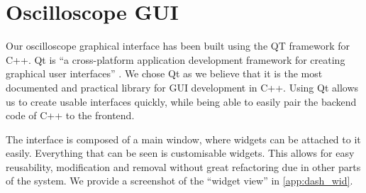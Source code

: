 \section{Oscilloscope GUI}
    Our oscilloscope graphical interface has been built using the QT framework for C++. Qt is ``a cross-platform application development framework for creating graphical user interfaces'' \cite{qt-w}. We chose Qt as we believe that it is the most documented and practical library for GUI development in C++. Using Qt allows us to create usable interfaces quickly, while being able to easily pair the backend code of C++ to the frontend.

    The interface is composed of a main window, where widgets can be attached to it easily. Everything that can be seen is customisable widgets. This allows for easy reusability, modification and removal without great refactoring due in other parts of the system. We provide a screenshot of the ``widget view'' in \cref{app:dash_wid}.


